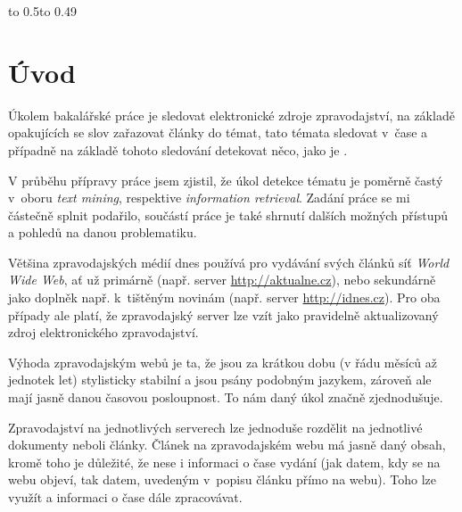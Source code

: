 \documentclass[12pt,a4paper]{report}
\let\openright=\clearpage
\def\chapwithtoc#1{
\chapter*{#1}
\addcontentsline{toc}{chapter}{#1}
}
\begin{document}
\vbox to 0.5\vsize{
\setlength\parindent{0mm}
\setlength\parskip{5mm}

\kecycz{}

\vss}\nobreak\vbox to 0.49\vsize{
\setlength\parindent{0mm}
\setlength\parskip{5mm}

\kecyen{}

\vss}




\newpage


\openright
\pagestyle{plain}
\setcounter{page}{1}
\tableofcontents

\chapwithtoc{Úvod}

Úkolem bakalářské práce je sledovat elektronické zdroje zpravodajství, na zá\-klad\-ě opakujících se slov zařazovat články do témat, tato témata sledovat v~čase a případně na základě tohoto sledování detekovat něco, jako je .

V průběhu přípravy práce jsem zjistil, že úkol detekce tématu je poměrně častý v~oboru \emph{text mining}, respektive \emph{information retrieval}. Zadání práce se mi částečně splnit podařilo, součástí práce je také shrnutí dalších možných přístupů a pohledů na danou problematiku.

Většina zpravodajských médií dnes používá pro vydávání svých článků síť \emph{World Wide Web}, ať už primárně (např. server \url{http://aktualne.cz}), nebo sekundárně jako doplněk např. k~tištěným novinám (např. server \url{http://idnes.cz}). Pro oba případy ale platí, že zpravodajský server lze vzít jako pravidelně aktualizovaný zdroj elektronického zpravodajství.

Výhoda zpravodajským webů je ta, že jsou za krátkou dobu (v řádu měsíců až jednotek let) stylisticky stabilní a jsou psány podobným jazykem, zároveň ale mají jasně danou časovou posloupnost. To nám daný úkol značně zjednodušuje.

Zpravodajství na jednotlivých serverech lze jednoduše rozdělit na jednotlivé dokumenty neboli články. Článek na zpravodajském webu má jasně daný obsah, kromě toho je důležité, že nese i informaci o čase vydání (jak datem, kdy se na webu objeví, tak datem, uvedeným v~popisu článku přímo na webu). Toho lze využít a informaci o čase dále zpracovávat.

\end{document}
